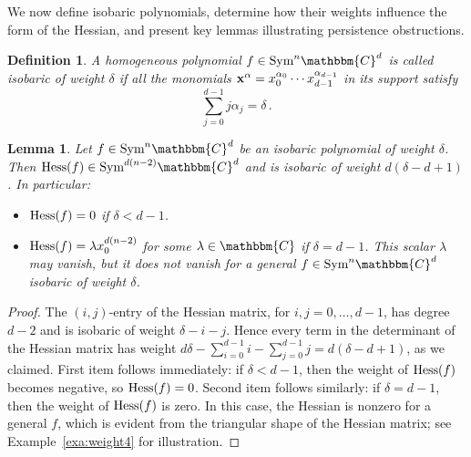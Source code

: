 \documentclass[aps,floatfix,groupedaddress,superscriptaddress,longbibliography,footinbib,notitlepage,showpacs]{revtex4-1}
\def\Hess{{\rm Hess}}
\newtheorem{lemma}[theorem]{Lemma}
\newtheorem{definition}[theorem]{Definition}
\begin{document}
We now define isobaric polynomials, determine how their weights influence the form of the Hessian, and present key lemmas illustrating persistence obstructions.

\begin{definition}
A homogeneous polynomial $f\in\text{Sym}^n\mathbbm{C}^d$  is called \emph{isobaric} of weight $\delta$ if all the monomials ${\bf{x}}^{\alpha}=x_0^{\alpha_0}\cdots x_{d-1}^{\alpha_{d-1}}$ in its support satisfy
\begin{equation}
\sum_{j=0}^{d-1}j\alpha_j=\delta\,.
\end{equation}
\end{definition}

\begin{lemma}\label{lem:weight}
Let $f\in\text{Sym}^n\mathbbm{C}^d$ be an isobaric polynomial of weight $\delta$. Then $\Hess(f)\in\text{Sym}^{d(n-2)}\mathbbm{C}^d$ and is isobaric of weight $d(\delta-d+1)$. In particular:
\begin{itemize}
\item[(i)] $\Hess(f)=0$ if $\delta<d-1$.
\item[(ii)] $\Hess(f)=\lambda x_0^{d(n-2)}$ for some $\lambda\in\mathbbm{C}$ if $\delta=d-1$. This scalar $\lambda$ may vanish, but it does not vanish for a general $f\in\text{Sym}^n\mathbbm{C}^d$ isobaric of weight $\delta$.
\end{itemize}
\end{lemma}
\begin{proof}
The $(i,j)$-entry of the Hessian matrix, for $i,j=0,\ldots, d-1$,
has degree $d-2$ and is isobaric of weight $\delta-i-j$.
Hence every term in the determinant of the Hessian matrix has weight $d\delta-\sum_{i=0}^{d-1}i-\sum_{j=0}^{d-1}j=
d(\delta-d+1)$, as we claimed. First item follows immediately: if $\delta<d-1$, then the weight of $\Hess(f)$ becomes negative, so $\Hess(f) = 0$. Second item follows similarly: if $\delta=d-1$, then the weight of $\Hess(f)$ is zero. In this case, the Hessian is nonzero for a general $f$, which is evident from the triangular shape of the Hessian matrix; see Example~\ref{exa:weight4} for illustration.
\end{proof}
\end{document}
